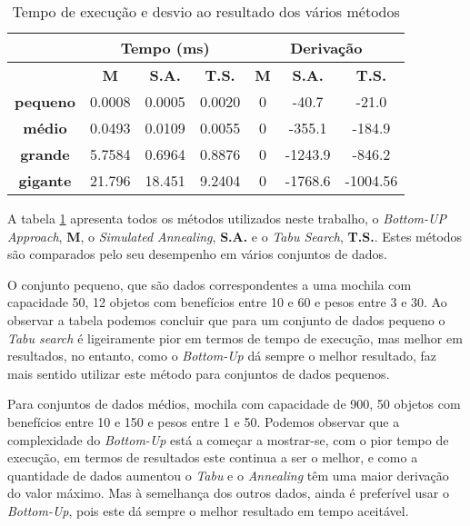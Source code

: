 \begin{table}[h!]
\label{tabela}
\centering
\begin{tabular}{|c|c|c|c||c|c|c|}
\hline
\multicolumn{1}{|c|}{\textbf{}} & \multicolumn{3}{c||}{\textbf{Tempo (ms)}} & \multicolumn{3}{c|}{\textbf{Derivação}} \\ \hline
\textbf{} & \textbf{M} & \textbf{S.A.} & \textbf{T.S.} & \textbf{M} & \textbf{S.A.} & \textbf{T.S.} \\ \hline
\textbf{pequeno} & 0.0008 & 0.0005 & 0.0020 & 0 & -40.7 & -21.0 \\ \hline
\textbf{médio} & 0.0493 & 0.0109 & 0.0055 & 0 & -355.1 & -184.9 \\ \hline
\textbf{grande} & 5.7584 & 0.6964 & 0.8876 & 0 & -1243.9 & -846.2 \\ \hline
\textbf{gigante} & 21.796 & 18.451 & 9.2404 & 0 & -1768.6 & -1004.56 \\ \hline
\end{tabular}
\caption{Tempo de execução e desvio ao resultado dos vários métodos}
\label{tab:results}
\end{table}

A tabela \ref{tab:results} apresenta todos os métodos utilizados neste trabalho, o \textit{Bottom-UP Approach}, \textbf{M}, o \textit{Simulated Annealing}, \textbf{S.A.} e o \textit{Tabu Search}, \textbf{T.S.}. Estes métodos são comparados pelo seu desempenho em vários conjuntos de dados.

O conjunto pequeno, que são dados correspondentes a uma mochila com capacidade 50, 12 objetos com benefícios entre 10 e 60 e pesos entre 3 e 30. Ao observar a tabela podemos concluir que para um conjunto de dados pequeno o \textit{Tabu search} é ligeiramente pior em termos de tempo de execução, mas melhor em resultados, no entanto, como o \textit{Bottom-Up} dá sempre o melhor resultado, faz mais sentido utilizar este método para conjuntos de dados pequenos.

Para conjuntos de dados médios, mochila com capacidade de 900, 50 objetos com benefícios entre 10 e 150 e pesos entre 1 e 50. Podemos observar que a complexidade do \textit{Bottom-Up} está a começar a mostrar-se, com o pior tempo de execução, em termos de resultados este continua a ser o melhor, e como a quantidade de dados aumentou o \textit{Tabu} e o \textit{Annealing} têm uma maior derivação do valor máximo. Mas à semelhança dos outros dados, ainda é preferível usar o \textit{Bottom-Up}, pois este dá sempre o melhor resultado em tempo aceitável.

